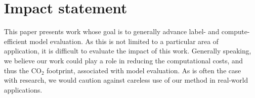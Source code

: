 \section{Impact statement}\label{sec:impact_statement}

This paper presents work whose goal is to generally advance label- and compute-efficient model evaluation.
As this is not limited to a particular area of application, it is difficult to evaluate the impact of this work.
Generally speaking, we believe our work could play a role in reducing the computational costs, and thus the CO$_2$ footprint, associated with model evaluation.
As is often the case with research, we would caution against careless use of our method in real-world applications.